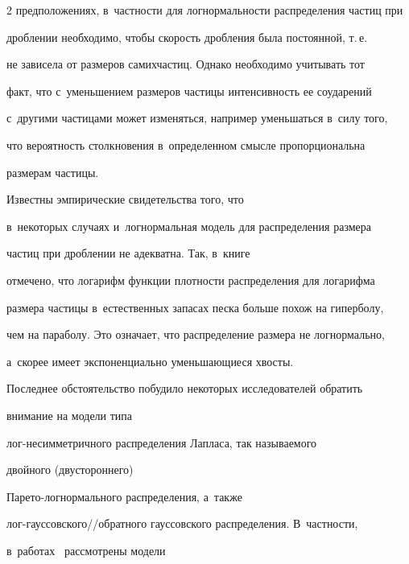 \begin{multicols}{2}
предположениях, в~част\-ности для логнормальности распределения час\-тиц при 


дроблении необходимо, чтобы ско\-рость дроб\-ле\-ния была постоянной, т.\,е.\ 


не зависела от размеров самих\linebreak час\-тиц. Однако необходимо учитывать тот 


факт, что с~уменьшением размеров час\-ти\-цы интенсивность ее соударений 


с~другими частицами может изменяться, например уменьшаться в~силу того, 


что вероятность столкновения в~определенном смыс\-ле пропорциональна 


размерам час\-тицы. 


{





}





Известны эмпирические свидетельства того, что 


в~некоторых случаях и~логнормальная модель для распределения размера 


частиц при дроблении не адекватна. Так, в~книге~\cite{Bagnold1954} 


отмечено, что логарифм функции плот\-ности распределения для логарифма 


размера частицы в~естественных запасах песка больше похож на гиперболу, 


чем на параболу. Это означает, что распределение размера не логнормально, 


а~скорее имеет экспоненциально уменьшающиеся хвосты.





Последнее обстоятельство побудило некоторых исследователей обратить 


внимание на модели типа  


лог-не\-сим\-мет\-рич\-но\-го распределения Лапласа, так называемого 


двойного (двустороннего)  


Па\-ре\-то-лог\-нор\-маль\-но\-го распределения, а~также 


лог-гаус\-сов\-ско\-го/\!/об\-рат\-но\-го гауссовского распределения. В~част\-ности, 


в~работах~\cite{ReedJorgensen2003,Sorensen2006} рассмотрены модели 



\end{multicols}
